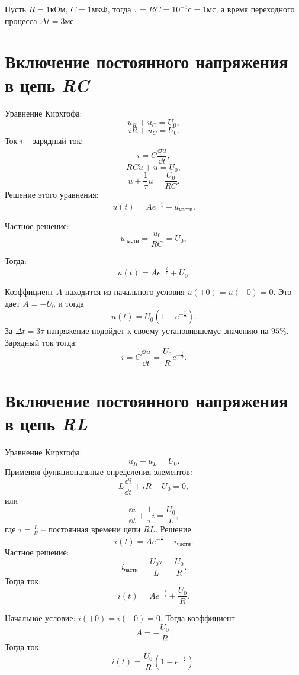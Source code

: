 	\begin{example}
	    Пусть \( R = 1 \)кОм, \( C = 1 \)мкФ, тогда \( \tau = RC =
        10^{-3} \text{с} = 1 \)мс, а время переходного процесса
        \( \Delta t = 3 \)мс.
	\end{example}
	
\section{Включение постоянного напряжения в цепь \textit{RC}}
	Уравнение Кирхгофа:
	\[
        u_R + u_C = U_0,
    \]
	\[
        iR + u_C = U_0.
    \]
	Ток \( i \) -- зарядный ток:
    \[
        i = C\frac{\dd u}{\dd t},
    \]
	\[
        RC\dot{u} + u = U_0,
    \]
	\[
        \dot{u} + \frac{1}{\tau}u = \frac{U_0}{RC}.
    \]
	Решение этого уравнения:
	\[
        u(t) = Ae^{-\frac{t}{\tau}} + u_{\textit{частн}}.
    \]
	
	Частное решение:
	\[
        u_{\textit{частн}} = \frac{u_0}{RC} = U_0,
    \]
	
	Тогда:
	\[
        u(t) = Ae^{-\frac{t}{\tau}} + U_0.
    \]
	
	Коэффициент \( A \) находится из начального условия \( u(+0) = u(-0) = 0 \).
    Это дает \(  A = -U_0 \) и тогда
	\begin{equation}
		u(t) = U_0(1 - e^{-\frac{t}{\tau}}).
	\end{equation}
	За \( \Delta t = 3\tau \) напряжение подойдет к своему установившемус
    значению на \( 95\% \).
	Зарядный ток тогда:
	\[
        i = C\frac{\dd u}{\dd t} = \frac{U_0}{R}e^{-\frac{t}{\tau}}.
    \]
	
\section{Включение постоянного напряжения в цепь \textit{RL}}

	Уравнение Кирхгофа:
	\[
        u_R + u_L = U_0.
    \]
	Применяя функциональные определения элементов:
	\[
        L\frac{\dd i}{\dd t} + iR - U_0 = 0,
    \]
	или
	\[
        \frac{\dd i}{\dd t} + \frac{1}{\tau}i = \frac{U_0}{L},
    \]
	где \( \tau = \frac{L}{R} \) -- постоянная времени цепи \( RL \). Решение
	\[
        i(t) = Ae^{-\frac{t}{\tau}} + i_{\textit{частн}}.
    \]
	Частное решение:
	\[
        i_{\textit{частн}} = \frac{U_0\tau}{L} = \frac{U_0}{R}.
    \]
	Тогда ток:
	\[
        i(t) = Ae^{-\frac{t}{\tau}} + \frac{U_0}{R}.
    \]
	
	Начальное условие: \( i(+0) = i(-0) = 0 \). Тогда коэффициент
    \[
        A = -\frac{U_0}{R}.
    \]
	Тогда ток:
	\begin{equation}
		i(t) = \frac{U_0}{R}(1 - e^{-\frac{t}{\tau}}).
        \label{eq15:5}
	\end{equation}
	
